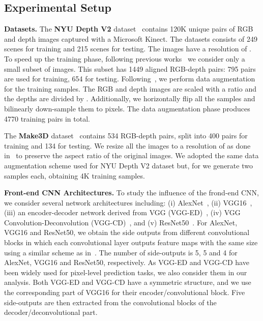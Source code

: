 \documentclass[10pt,twocolumn,letterpaper]{article}
\begin{document}
\subsection{Experimental Setup}
\label{setup}
\textbf{Datasets.} The \textbf{NYU Depth V2} dataset~\cite{silberman2012indoor} contains 120K unique pairs of RGB and depth images captured with a 
Microsoft Kinect. The datasets consists of 249 scenes for training and 215 scenes for testing. The images
have a resolution of . To speed up the training phase, following previous works~\cite{liu2015deep,zhuo2015indoor}
we consider only a small subset of images. This subset has 1449 aligned RGB-depth pairs:
795 pairs are used for training, 654 for testing. Following~\cite{eigen2014depth}, we perform data augmentation for 
the training samples. The RGB and depth images are scaled with a ratio  and the depths are divided by . Additionally,
we horizontally flip all the samples and bilinearly down-sample them to  pixels. The data augmentation phase produces 
4770 training pairs in total. 

The \textbf{Make3D} dataset~\cite{saxena2005learning} contains 534 RGB-depth pairs, split into 400 pairs for training and 134 for testing. 
We resize all the images to a resolution of  as done in~\cite{liu2014discrete} to preserve the aspect ratio 
of the original images. We adopted the same data augmentation scheme used for NYU Depth V2 dataset but,
for  we generate two samples each, obtaining 4K training samples. 

\textbf{Front-end CNN Architectures.} 
To study the influence of the frond-end CNN, we consider several network architectures 
including: (i) AlexNet~\cite{krizhevsky2012imagenet}, (ii) VGG16~\cite{simonyan2014very}, 
(iii) an encoder-decoder network derived from VGG (VGG-ED)~\cite{badrinarayanan2015segnet}, 
(iv) VGG Convolution-Deconvolution (VGG-CD)~\cite{noh2015learning}, and (v) ResNet50~\cite{he2015deep}. For AlexNet, VGG16 and ResNet50, 
we obtain the side outputs from different convolutional blocks in which each convolutional layer outputs feature maps with the same size 
using a similar scheme as in~\cite{xie2015holistically}.
The number of side-outputs is 5, 5 and 4 for AlexNet, VGG16 and ResNet50, respectively. As VGG-ED and VGG-CD have been widely used for pixel-level prediction tasks, we also consider them in our analysis. Both VGG-ED and VGG-CD have a symmetric structure, and we use the corresponding part of VGG16 for their encoder/convolutional block. Five side-outputs are then extracted from the convolutional blocks of the decoder/deconvolutional part.
\end{document}
